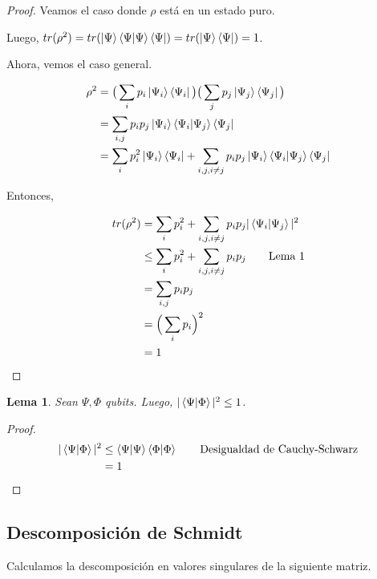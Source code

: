 \documentclass[a4paper,11pt]{article}
\newtheorem{lemma}[theorem2]{Lema}
\begin{document}
\begin{proof}
Veamos el caso donde $\rho$ está en un estado puro.

Luego, $tr(\rho^2) = tr(\left\vert{\Psi}\right\rangle\braket{\Psi | \Psi}\left\langle{\Psi}\right\vert) = tr(\left\vert{\Psi}\right\rangle\left\langle{\Psi}\right\vert) = 1$.

Ahora, vemos el caso general.

\begin{align*}
  \rho^2 
  &= \big( \sum_{i} p_i \left\vert{\Psi_i}\right\rangle\left\langle{\Psi_i}\right\vert \big) \big( \sum_{j} p_j \left\vert{\Psi_j}\right\rangle\left\langle{\Psi_j}\right\vert \big) 
  \\ &=\sum_{i, j} p_i p_j\left\vert{\Psi_i}\right\rangle\braket{\Psi_i | \Psi_j}\left\langle{\Psi_j}\right\vert
  \\ &= \sum_{i} p_i^2\left\vert{\Psi_i}\right\rangle\left\langle{\Psi_i}\right\vert + 
       \sum_{i, j, i \neq j} p_i p_j\left\vert{\Psi_i}\right\rangle\braket{\Psi_i | \Psi_j}\left\langle{\Psi_j}\right\vert
\end{align*}


Entonces, 

\begin{align*}
  tr(\rho^2) 
  &= \sum_{i} p_i^2 + 
    \sum_{i, j, i \neq j} p_i p_j|\braket{\Psi_i | \Psi_j}|^2
  \\ &\le \sum_{i} p_i^2 + 
       \sum_{i, j, i \neq j} p_i p_j               \tag*{Lema 1}
  \\ &= \sum_{i,j} p_ip_j 
  \\ &= \Big( \sum_{i}p_i \Big)^2 
  \\ &= 1 
\end{align*}

\end{proof}

\begin{lemma}
Sean $\Psi, \Phi$ qubits. Luego, $|\braket{\Psi | \Phi}|^2 \leq 1$.
\end{lemma}

\begin{proof}
\begin{align*}
  |\braket{\Psi | \Phi}|^2
  &\le \braket{\Psi | \Psi} \braket{\Phi | \Phi}   \tag*{Desigualdad de Cauchy-Schwarz}
  \\ &= 1
\end{align*}

\end{proof}

\subsection*{Descomposición de Schmidt}

Calculamos la descomposición en valores singulares de la siguiente matriz.
\end{document}
